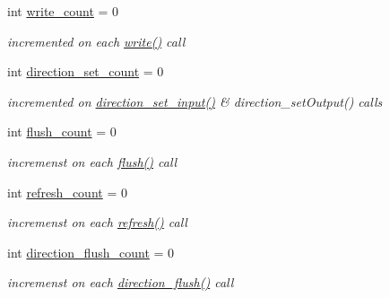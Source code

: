\begin{DoxyCompactItemize}
int \hyperlink{classhwlib_1_1pin__in__out__store_a7f51535fc78a23092cde787e618bf3b7}{write\+\_\+count} = 0
\begin{DoxyCompactList}\small\item\em incremented on each \hyperlink{classhwlib_1_1pin__in__out__store_a8328b4207d39521fe525d710cc4bf800}{write()} call \end{DoxyCompactList}\item 
\mbox{\label{classhwlib_1_1pin__in__out__store_a54004fe37c8d530cb2063eb311be0112}} 
int \hyperlink{classhwlib_1_1pin__in__out__store_a54004fe37c8d530cb2063eb311be0112}{direction\+\_\+set\+\_\+count} = 0
\begin{DoxyCompactList}\small\item\em incremented on \hyperlink{classhwlib_1_1pin__in__out__store_a0e37e1e5712f3f929828687af68e0f1a}{direction\+\_\+set\+\_\+input()} \& direction\+\_\+set\+Output() calls \end{DoxyCompactList}\item 
\mbox{\label{classhwlib_1_1pin__in__out__store_a77df9a0a05db65e915e0427f760c339e}} 
int \hyperlink{classhwlib_1_1pin__in__out__store_a77df9a0a05db65e915e0427f760c339e}{flush\+\_\+count} = 0
\begin{DoxyCompactList}\small\item\em incremenst on each \hyperlink{classhwlib_1_1pin__in__out__store_ab937ad62722a0295a1829cf60d18b468}{flush()} call \end{DoxyCompactList}\item 
\mbox{\label{classhwlib_1_1pin__in__out__store_acd2a8145b4dfdc826053615b023b4c29}} 
int \hyperlink{classhwlib_1_1pin__in__out__store_acd2a8145b4dfdc826053615b023b4c29}{refresh\+\_\+count} = 0
\begin{DoxyCompactList}\small\item\em incremenst on each \hyperlink{classhwlib_1_1pin__in__out__store_a6b0862f07398e67ec22b7ed2c293c484}{refresh()} call \end{DoxyCompactList}\item 
\mbox{\label{classhwlib_1_1pin__in__out__store_a0fbd7cf032dad9c61a213a7b4ff11979}} 
int \hyperlink{classhwlib_1_1pin__in__out__store_a0fbd7cf032dad9c61a213a7b4ff11979}{direction\+\_\+flush\+\_\+count} = 0
\begin{DoxyCompactList}\small\item\em incremenst on each \hyperlink{classhwlib_1_1pin__in__out__store_ae26b3186167d3f10db2bb73573c366da}{direction\+\_\+flush()} call \end{DoxyCompactList}\end{DoxyCompactItemize}


